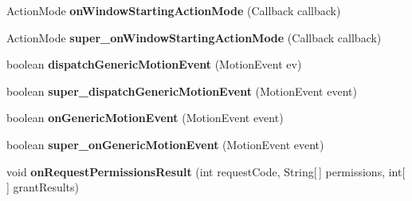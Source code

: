 \begin{DoxyCompactItemize}
Action\+Mode {\bfseries on\+Window\+Starting\+Action\+Mode} (Callback callback)
\item 
\mbox{\label{classorg_1_1qtproject_1_1qt5_1_1android_1_1bindings_1_1_qt_activity_ab5274596bd70c9e9c9ec1357a21dc5ca}} 
Action\+Mode {\bfseries super\+\_\+on\+Window\+Starting\+Action\+Mode} (Callback callback)
\item 
\mbox{\label{classorg_1_1qtproject_1_1qt5_1_1android_1_1bindings_1_1_qt_activity_af07a8b1fc7351790bcfc1f51fc606282}} 
boolean {\bfseries dispatch\+Generic\+Motion\+Event} (Motion\+Event ev)
\item 
\mbox{\label{classorg_1_1qtproject_1_1qt5_1_1android_1_1bindings_1_1_qt_activity_ab2ac663a88e3c822cde3642d091250b5}} 
boolean {\bfseries super\+\_\+dispatch\+Generic\+Motion\+Event} (Motion\+Event event)
\item 
\mbox{\label{classorg_1_1qtproject_1_1qt5_1_1android_1_1bindings_1_1_qt_activity_a213b9b41d6254141e1ab9a15c3486edf}} 
boolean {\bfseries on\+Generic\+Motion\+Event} (Motion\+Event event)
\item 
\mbox{\label{classorg_1_1qtproject_1_1qt5_1_1android_1_1bindings_1_1_qt_activity_a7421afe77afae492ff1a71ded4664d9c}} 
boolean {\bfseries super\+\_\+on\+Generic\+Motion\+Event} (Motion\+Event event)
\item 
\mbox{\label{classorg_1_1qtproject_1_1qt5_1_1android_1_1bindings_1_1_qt_activity_aca9ba31d8edcfa1b1cecd0a220b97497}} 
void {\bfseries on\+Request\+Permissions\+Result} (int request\+Code, String\mbox{[}$\,$\mbox{]} permissions, int\mbox{[}$\,$\mbox{]} grant\+Results)
\end{DoxyCompactItemize}
